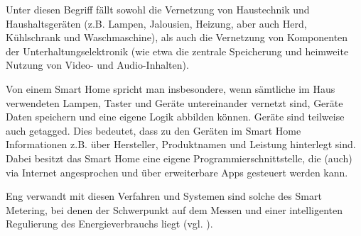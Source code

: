 Unter diesen Begriff fällt sowohl die Vernetzung von Haustechnik und Haushaltsgeräten (z.B. Lampen, Jalousien, Heizung, aber auch Herd, Kühlschrank und Waschmaschine), als auch die Vernetzung von Komponenten der Unterhaltungselektronik (wie etwa die zentrale Speicherung und heimweite Nutzung von Video- und Audio-Inhalten).

Von einem Smart Home spricht man insbesondere, wenn sämtliche im Haus verwendeten Lampen, Taster und Geräte untereinander vernetzt sind, Geräte Daten speichern und eine eigene Logik abbilden können. Geräte sind teilweise auch getagged. Dies bedeutet, dass zu den Geräten im Smart Home Informationen z.B. über Hersteller, Produktnamen und Leistung hinterlegt sind. Dabei besitzt das Smart Home eine eigene Programmierschnittstelle, die (auch) via Internet angesprochen und über erweiterbare Apps gesteuert werden kann.

Eng verwandt mit diesen Verfahren und Systemen sind solche des Smart Metering, bei denen der Schwerpunkt auf dem Messen und einer intelligenten Regulierung des Energieverbrauchs liegt (vgl. \cite{wiki:smho}).

